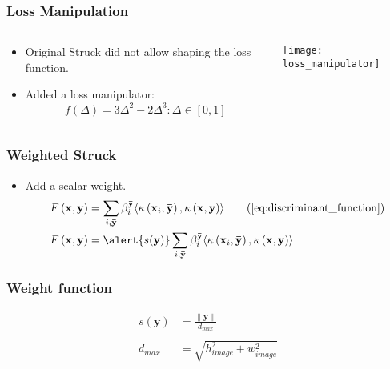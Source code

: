 %
\begin{frame}
    \frametitle{Loss Manipulation}
    \begin{columns}[T]
        \begin{column}{0.5\textwidth}
            \begin{itemize}
                \item Original Struck did not allow shaping the loss function.
                \item Added a loss manipulator:
                    \begin{equation}
                        f(\Delta) = 3\Delta^2 - 2\Delta^3 : \Delta \in [0, 1]
                    \end{equation}
            \end{itemize}
        \end{column}
        \begin{column}{0.5\textwidth}
            \texttt{[image: loss\_manipulator]}
        \end{column}
    \end{columns}
\end{frame}

\begin{frame}
    \frametitle{Weighted Struck}
    \begin{itemize}
        \item Add a scalar weight.
            \begin{align}
                F\left(\mathbf{x}, \mathbf{y}\right) &= \sum_{i, \mathbf{\bar{y}}} \beta_i^\mathbf{\bar{y}}
                    \langle \kappa\left(\mathbf{x}_i, \mathbf{\bar{y}}\right),
                    \kappa\left(\mathbf{x}, \mathbf{y}\right) \rangle
                    \tag{\ref{eq:discriminant_function}} \\
                F\left(\mathbf{x}, \mathbf{y}\right) &= \alert{s(\mathbf{y})} \sum_{i, \mathbf{\bar{y}}} \beta_i^\mathbf{\bar{y}}
                    \langle \kappa\left(\mathbf{x}_i, \mathbf{\bar{y}}\right),
                    \kappa\left(\mathbf{x}, \mathbf{y}\right) \rangle
            \end{align}
    \end{itemize}
\end{frame}

\begin{frame}
    \frametitle{Weight function}
    \begin{align}
        s \left( \mathbf{y} \right) &= \frac{\|\mathbf{y}\|}{d_{max}} \\
        \nonumber \\
        d_{max} &= \sqrt{h_{image}^2 + w_{image}^2}
    \end{align}
\end{frame}


